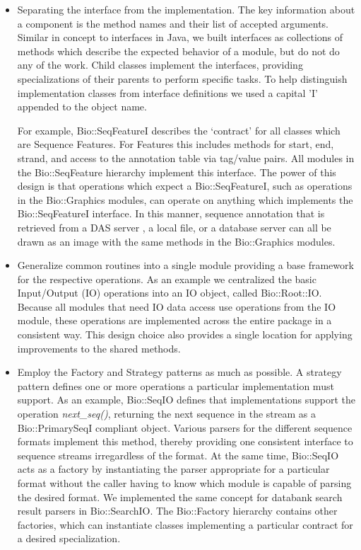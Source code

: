 \documentclass[12pt]{article}
\begin{document}
\begin{itemize}

\item Separating the interface from the implementation.  The key
information about a component is the method names and their list
of accepted arguments.  Similar in concept to interfaces in Java, we
built interfaces as collections of methods which describe the expected
behavior of a module, but do not do any of the work.  Child classes
implement the interfaces, providing specializations of their parents
to perform specific tasks.  To help distinguish implementation classes from
interface definitions we used a capital 'I' appended to the object
name.

For example, Bio::SeqFeatureI describes the `contract' for all classes
which are Sequence Features.  For Features this includes methods for
start, end, strand, and access to the annotation table via tag/value
pairs.  All modules in the Bio::SeqFeature hierarchy implement this
interface.  The power of this design is that operations which expect a
Bio::SeqFeatureI, such as operations in the Bio::Graphics modules, can
operate on anything which implements the Bio::SeqFeatureI interface.
In this manner, sequence annotation that is retrieved from a DAS
server \cite{das}, a local file, or a database server can all be drawn
as an image with the same methods in the Bio::Graphics modules.

\item Generalize common routines into a single module providing a base
framework for the respective operations.  As an example we centralized
the basic Input/Output (IO) operations into an IO object, called
Bio::Root::IO.  Because all modules that need IO data access use
operations from the IO module, these operations are implemented across
the entire package in a consistent way.  This design choice also
provides a single location for applying improvements to the shared
methods.

\item Employ the Factory and Strategy patterns \cite{gangoffour} as
much as possible. A strategy pattern defines one or more operations a
particular implementation must support. As an example, Bio::SeqIO
defines that implementations support the operation
\textit{next\_seq()}, returning the next sequence in the stream as a
Bio::PrimarySeqI compliant object. Various parsers for the different
sequence formats implement this method, thereby providing one
consistent interface to sequence streams irregardless of the
format. At the same time, Bio::SeqIO acts as a factory by
instantiating the parser appropriate for a particular format without
the caller having to know which module is capable of parsing the
desired format. We implemented the same concept for databank search
result parsers in Bio::SearchIO. The Bio::Factory hierarchy contains
other factories, which can instantiate classes implementing a
particular contract for a desired specialization.

\end{itemize}
\end{document}
